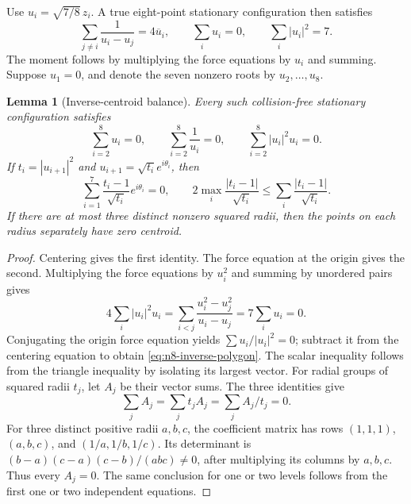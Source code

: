\documentclass[11pt]{article}
\newtheorem{lemma}[theorem]{Lemma}
\theoremstyle{remark}
\numberwithin{equation}{section}
\begin{document}
Use $u_i=\sqrt{7/8}\,z_i$. A true eight-point stationary configuration
then satisfies
\[
 \sum_{j\ne i}\frac1{u_i-u_j}=4\overline u_i,
 \qquad \sum_i u_i=0,\qquad \sum_i|u_i|^2=7.
\]
The moment follows by multiplying the force equations by $u_i$ and
summing. Suppose $u_1=0$, and denote the seven nonzero roots by
$u_2,\ldots,u_8$.

\begin{lemma}[Inverse-centroid balance]\label{lem:n8-inverse-centroid}
Every such collision-free stationary configuration satisfies
\[
 \sum_{i=2}^8u_i=0,\qquad \sum_{i=2}^8\frac1{u_i}=0,
 \qquad\sum_{i=2}^8|u_i|^2u_i=0.
\]
If $t_i=|u_{i+1}|^2$ and $u_{i+1}=\sqrt{t_i}e^{i\theta_i}$, then
\begin{equation}\label{eq:n8-inverse-polygon}
 \sum_{i=1}^7\frac{t_i-1}{\sqrt{t_i}}e^{i\theta_i}=0,
 \qquad
 2\max_i\frac{|t_i-1|}{\sqrt{t_i}}
       \le\sum_i\frac{|t_i-1|}{\sqrt{t_i}}.
\end{equation}
If there are at most three distinct nonzero squared radii, then
the points on each radius separately have zero centroid.
\end{lemma}
\begin{proof}
Centering gives the first identity. The force equation at the origin
gives the second. Multiplying the force equations by $u_i^2$ and
summing by unordered pairs gives
\[
 4\sum_i|u_i|^2u_i
 =\sum_{i<j}\frac{u_i^2-u_j^2}{u_i-u_j}
 =7\sum_i u_i=0.
\]
Conjugating the origin force equation yields
$\sum u_i/|u_i|^2=0$; subtract it from the centering equation to obtain
\eqref{eq:n8-inverse-polygon}. The scalar inequality follows from the
triangle inequality by isolating its largest vector.
For radial groups of squared radii $t_j$, let $A_j$ be their vector
sums. The three identities give
\[
                  \sum_j A_j=\sum_j t_j A_j=\sum_j A_j/t_j=0.
\]
For three distinct positive radii $a,b,c$, the coefficient matrix has
rows $(1,1,1)$, $(a,b,c)$, and $(1/a,1/b,1/c)$. Its determinant is
$(b-a)(c-a)(c-b)/(abc)\ne0$, after multiplying its columns by
$a,b,c$. Thus every $A_j=0$. The same conclusion for one or two
levels follows from the first one or two independent equations.
\end{proof}
\end{document}
